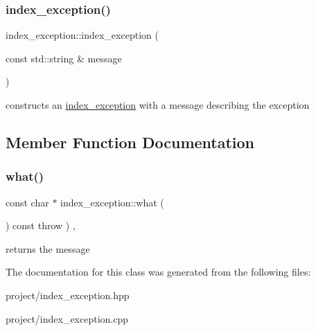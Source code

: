 \subsubsection{\texorpdfstring{index\+\_\+exception()}{index\_exception()}}
{\footnotesize\ttfamily index\+\_\+exception\+::index\+\_\+exception (\begin{DoxyParamCaption}\item[{const std\+::string \&}]{message }\end{DoxyParamCaption})\hspace{0.3cm}{\ttfamily [explicit]}}

constructs an \hyperlink{classindex__exception}{index\+\_\+exception} with a message describing the exception 

\subsection{Member Function Documentation}
\mbox{\label{classindex__exception_a24b7e09d16d48e79c2a200cdd334b906}} 
\subsubsection{\texorpdfstring{what()}{what()}}
{\footnotesize\ttfamily const char $\ast$ index\+\_\+exception\+::what (\begin{DoxyParamCaption}{ }\end{DoxyParamCaption}) const throw  ) \hspace{0.3cm}{\ttfamily [override]}, {\ttfamily [virtual]}}

returns the message 

The documentation for this class was generated from the following files\+:\begin{DoxyCompactItemize}
\item 
project/index\+\_\+exception.\+hpp\item 
project/index\+\_\+exception.\+cpp\end{DoxyCompactItemize}
